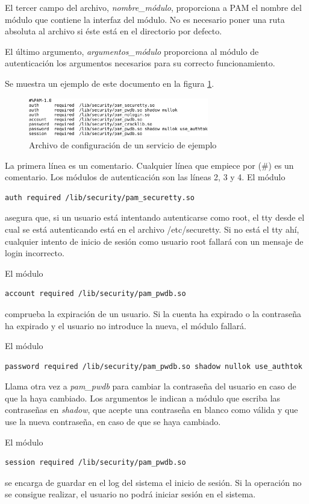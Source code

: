 \documentclass[twoside, titlepage, 12pt, a4paper]{article}
\begin{document}
El tercer campo del archivo, \textit{nombre\_módulo}, proporciona a PAM el nombre del módulo que contiene la interfaz del módulo. No es necesario poner una ruta absoluta al archivo si éste está en el directorio por defecto. \par
El último argumento, \textit{argumentos\_módulo} proporciona al módulo de autenticación los argumentos necesarios para su correcto funcionamiento. \par
Se muestra un ejemplo de este documento en la figura \ref{fig:archivoServicio}.
\begin{figure}[H]
    \centering
    \includegraphics[width=0.7\textwidth]{Media/PAMConfigFile.png}
    \caption{Archivo de configuración de un servicio de ejemplo}
    \label{fig:archivoServicio}
\end{figure}
La primera línea es un comentario. Cualquier línea que empiece por (\#) es un comentario. Los módulos de autenticación son las líneas 2, 3 y 4. El módulo
\begin{lstlisting}
auth required /lib/security/pam_securetty.so
\end{lstlisting}
asegura que, si un usuario está intentando autenticarse como root, el \gls{tty} desde el cual se está autenticando está en el archivo /etc/securetty. Si no está el \gls{tty} ahí, cualquier intento de inicio de sesión como usuario \gls{root} fallará con un mensaje de login incorrecto. \par
El módulo 
\begin{lstlisting}
account required /lib/security/pam_pwdb.so
\end{lstlisting}
comprueba la expiración de un usuario. Si la cuenta ha expirado o la contraseña ha expirado y el usuario no introduce la nueva, el módulo fallará. \par
El módulo 
\begin{lstlisting}
password required /lib/security/pam_pwdb.so shadow nullok use_authtok
\end{lstlisting}
Llama otra vez a \textit{pam\_pwdb} para cambiar la contraseña del usuario en caso de que la haya cambiado. Los argumentos le indican a módulo que escriba las contraseñas en \textit{shadow}, que acepte una contraseña en blanco como válida y que use la nueva contraseña, en caso de que se haya cambiado. \par
El módulo
\begin{lstlisting}
session required /lib/security/pam_pwdb.so
\end{lstlisting}
se encarga de guardar en el log del sistema el inicio de sesión. Si la operación no se consigue realizar, el usuario no podrá iniciar sesión en el sistema.
\end{document}
